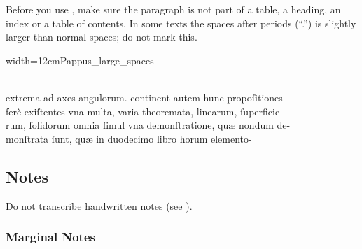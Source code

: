 \begin{clarification}
Before you use , make sure the paragraph is not part of a table, a heading, an index or a table of contents. In some texts the spaces after periods (“.”) is slightly larger than normal spaces; do not mark this.
\end{clarification}

\begin{sampleImageSmall}[ 2]{width=12cm}{Pappus_large_spaces}

\begin{typeLatin}
 \someText \\
extrema ad axes  angulorum. continent autem hunc propoſitiones  \\
ferè exiſtentes vna multa,  varia theoremata,  linearum, \lwr ſuperficie-  \\
rum,  ſolidorum omnia ſimul vna demonſtratione,  quæ nondum de-  \\
monſtrata ſunt,  quæ   in duodecimo libro horum elemento-  \\
\someText {}
\end{typeLatin}
\end{sampleImageSmall}



\tocspace
\subsection{Notes}

\begin{note}
Do not transcribe handwritten notes (see ).
\end{note}

\subsubsection{Marginal Notes}
\label{section marginal notes}


